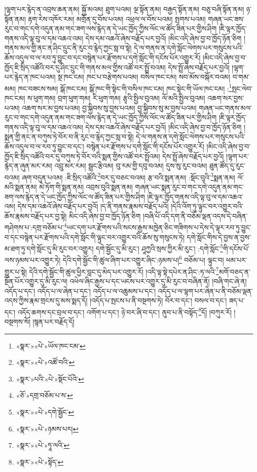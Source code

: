 །ལྷག་པར་རྙེད་ན་འབྲས་ཆན་ནམ། སྐྱོ་མའམ། ཐུག་པའམ། ལྔ་སྟོན་ནམ། བརྒྱད་སྟོན་ནམ། བཅུ་བཞི་སྟོན་ནམ། ཉ་སྟོན་ནམ། རྟག་རེས་འཁོར་རམ། མགྲོན་དུ་བོས་པའམ། འཕྲལ་ལ་བོས་པའམ། སྤགས་པའམ། གཞན་ཡང་ཟས་རུང་བ་གང་དགེ་འདུན་ནམ་གང་ཟག་ལས་རྙེད་ན་དེ་ཡང་ཁྱོད་ཀྱིས་ལོང་ལ་ཚོད་ཟིན་པར་གྱིས་ཤིག །ཇི་ལྟར་ཁྱོད་གནས་འདི་ལྟ་བུ་ལ་དམ་འཆའ་འམ། དེས་དམ་འཆའོ་ཞེས་བརྗོད་པར་བྱའོ། །མིང་འདི་ཞེས་བྱ་བ་ཁྱོད་ཉོན་ཅིག །གནས་མལ་གྱི་ནང་ན་ཤིང་དྲུང་ནི་རུང་བ་རྙེད་ཀྱང་སླ་བ་སྟེ། དེ་ལ་གནས་ན་དགེ་སློང་ལེགས་པར་གསུངས་པའི་ཆོས་འདུལ་བ་ལ་རབ་ཏུ་བྱུང་བ་དང་བསྙེན་པར་རྫོགས་པ་དགེ་སློང་གི་དངོས་པོར་འགྱུར་རོ། །མིང་འདི་ཞེས་བྱ་བ་ཁྱོད་ཇི་སྲིད་འཚོའི་བར་དུ་ཤིང་དྲུང་གི་གནས་མལ་གྱིས་འཚོ་བར་སྤྲོ་བའམ། དེས་སྤྲོ་ཞེས་བརྗོད་པར་བྱའོ། །ལྷག་པར་རྙེད་ན་ཁང་པའམ། སྔ་ཁང་ངམ། ཁང་པ་བརྩེགས་པའམ། བསིལ་ཁང་ངམ། སབ་མོས་བསྐོར་བའམ། བ་གམ་མམ། ཁང་བཟངས་སམ། སྒོ་ཁང་ངམ། སྒོ་ཁང་གི་སྟེང་གི་བསིལ་ཁང་ངམ། ཁང་སྟེང་གི་ཡོལ་ཁང་ངམ། :\footnote{«སྣར་»«པེ་»ཡོལ་ཁང་ངམ་}སྤང་ལེབ་ཁང་ངམ། ས་ཕུག་གམ། བྲག་ཕུག་གམ། རི་ཕུག་གམ། རྩྭའི་སྤྱིལ་བུའམ། ལོ་མའི་སྤྱིལ་བུའམ། འཆག་སར་བྱས་པའམ། འཆག་སར་མ་བྱས་པའམ། བྱ་སྐྱིབས་སུ་བྱས་པའམ། བྱ་སྐྱིབས་སུ་མ་བྱས་པའམ། གཞན་ཡང་གནས་མལ་རུང་བ་གང་དགེ་འདུན་ནམ་གང་ཟག་ལས་རྙེད་ན་དེ་ཡང་ཁྱོད་ཀྱིས་ལོང་ལ་ཚོད་ཟིན་པར་གྱིས་ཤིག །ཇི་ལྟར་ཁྱོད་གནས་འདི་ལྟ་བུ་ལ་དམ་འཆའ་འམ། དེས་དམ་འཆའོ་ཞེས་བརྗོད་པར་བྱའོ། །མིང་འདི་ཞེས་བྱ་བ་ཁྱོད་ཉོན་ཅིག །སྨན་གྱི་ནང་ན་བཀུས་ཏེ་བོར་བ་ནི་རུང་བ་རྙེད་ཀྱང་སླ་བ་སྟེ། དེ་ལ་གནས་ན་དགེ་སློང་ལེགས་པར་གསུངས་པའི་ཆོས་འདུལ་བ་ལ་རབ་ཏུ་བྱུང་བ་དང་། བསྙེན་པར་རྫོགས་པ་དགེ་སློང་གི་དངོས་པོར་འགྱུར་རོ། །མིང་འདི་ཞེས་བྱ་བ་ཁྱོད་ཇི་སྲིད་འཚོའི་བར་དུ་བཀུས་ཏེ་བོར་བའི་སྨན་གྱིས་འཚོ་བར་སྤྲོའམ། དེས་སྤྲོ་ཞེས་བརྗོད་པར་བྱའོ། །ལྷག་པར་རྙེད་ན་ཞུན་མར་རམ། འབྲུ་མར་རམ། སྦྲང་རྩིའམ། བུ་རམ་གྱི་དབུ་བའམ། དུས་སུ་རུང་བའམ། ཐུན་ཚོད་དུ་རུང་བའམ། ཞག་བདུན་པའམ། :ཇི་སྲིད་འཚོའི་\footnote{«སྣར་»«པེ་»འཚོ་བའི་}བར་དུ་བཅང་བའམ། རྩ་བའི་སྨན་ནམ། :སྡོང་བུའི་\footnote{«སྣར་»པའི་«པེ་»སྡོང་པོའི་}སྨན་ནམ། ལོ་མའི་སྨན་ནམ། མེ་ཏོག་གི་སྨན་ནམ། འབྲས་བུའི་སྨན་ནམ། གཞན་ཡང་སྨན་རུང་བ་གང་དགེ་འདུན་ནམ་གང་ཟག་ལས་རྙེད་ན་དེ་ཡང་ཁྱོད་ཀྱིས་ལོང་ལ་ཚོད་ཟིན་པར་གྱིས་ཤིག །ཇི་ལྟར་ཁྱོད་གནས་འདི་ལྟ་བུ་ལ་དམ་འཆའ་འམ། དེས་དམ་འཆའོ་ཞེས་བརྗོད་པར་བྱའོ། །ད་ནི་གནས་རྣམས་བརྗོད་པའོ། །དེའི་འོག་ཏུ་ལྟུང་བར་འགྱུར་བའི་ཆོས་རྣམས་བརྗོད་པར་བྱ་སྟེ། མིང་འདི་ཞེས་བྱ་བ་ཁྱོད་ཉོན་ཅིག །བཞི་པོ་འདི་དག་ནི་བཅོམ་ལྡན་འདས་དེ་བཞིན་གཤེགས་པ་:དགྲ་བཅོམ་པ་\footnote{«ཅོ་»དགྲ་བཅོམ་པ་ས་}ཡང་དག་པར་རྫོགས་པའི་སངས་རྒྱས་མཁྱེན་ཅིང་གཟིགས་པ་དེས་དེ་ལྟར་རབ་ཏུ་བྱུང་བ་དང་བསྙེན་པར་རྫོགས་པའི་དགེ་སློང་གི་ལྟུང་བར་འགྱུར་བའི་ཆོས་སུ་གསུངས་ཏེ། དགེ་སློང་གིས་དེ་བྱས་ན་བྱས་མ་ཐག་ཏུ་དགེ་སློང་དུ་མི་རུང་བར་འགྱུར། དགེ་སྦྱོང་དུ་མི་རུང་། ཤཱཀྱའི་སྲས་ཀྱིར་མི་རུང་། :དགེ་སློང་\footnote{«སྣར་»«པེ་»དགེ་སྦྱོང་}གི་དངོས་པོ་ལས་ཉམས་པར་འགྱུར་ཏེ། དེའི་དགེ་སྦྱོང་གི་ཚུལ་ཞིག་པར་འགྱུར་ཞིང་:ཉམས་པ།\footnote{«སྣར་»«པེ་»ཉམས་པར།} བཅོམ་པ། ལྟུང་བ། ཕམ་པར་གྱུར་པ་སྟེ། དེའི་དགེ་སྦྱོང་གི་ཚུལ་ཕྱིར་བླང་དུ་མེད་པར་འགྱུར་རོ། །འདི་ལྟ་སྟེ་དཔེར་ན་ཤིང་:ཏ་ལའི་\footnote{«སྣར་»«པེ་»ཏཱ་ལའི་}མགོ་བཅད་ན་སྔོན་པོར་འགྱུར་དུ་མི་རུང་ལ། འཕེལ་ཞིང་རྒྱས་པ་དང་ཡངས་པར་འགྱུར་དུ་མི་རུང་བ་བཞིན་ནོ། །བཞི་གང་ཞེ་ན། འདོད་པ་དང་། འདོད་པ་ལ་ཞེན་པ་དང་། འདོད་པ་ལ་འཆུམས་པ་དང་། འདོད་པ་ལ་ལྷག་པར་ཞེན་པ་ནི་བཅོམ་ལྡན་འདས་ཀྱིས་རྣམ་གྲངས་དུ་མས་སྨད་དོ། །འདོད་པ་སྤངས་པ་ནི་བསྔགས་ཏེ། བོར་བ་དང་། བསལ་བ་དང་། ཟད་པ་དང་། འདོད་ཆགས་དང་བྲལ་བ་དང་། འགོག་པ་དང་། ཉེ་བར་ཞི་བ་དང་། ནུབ་པ་ནི་བསྟོད་\footnote{«སྣར་»«པེ་»སྟོད་}དོ། །བཀུར་རོ། །བསྔགས་སོ། །སྙན་པར་བརྗོད་དོ། 